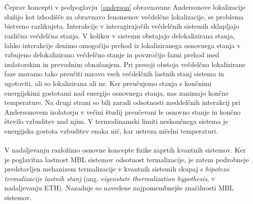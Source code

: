 \\\\ 
Čeprav koncepti v podpoglavju~\ref{anderson} obravnavane Andersonove lokalizacije služijo kot izhodišče za obravnavo fenomenov večdelčne lokalizacije, se problema bistveno razlikujeta. Interakcije v interagirajočih večdelčnih sistemih sklapljajo različna večdelčna stanja. V kolikor v sistemu obstajajo delokalizirana stanja, lahko interakcije denimo omogočijo prehod iz lokaliziranega osnovnega stanja v vzbujeno delokalizirano večdelčno stanje in povzročijo fazni prehod med izolatorskim in prevodnim obnašanjem. Pri presoji obstoja večdelčno lokalizirane faze moramo tako preučiti naravo vseh večdelčnih lastnih stanj sistema in ugotoviti, ali so lokalizirana ali ne. Ker preučujemo stanja s končnimi energijskimi gostotami nad energijo osnovnega stanja, nas zanimajo končne temperature. Na drugi strani so bili zaradi odsotnosti meddelčnih interakcij pri Andersonovem izolatorju v večini študij preučevani le osnovno stanje in končno število vzbuditev nad njim. V termodinamski limiti neskončnega sistema je energijska gostota vzbuditev enaka nič, kar ustreza ničelni temperaturi. 
\\\\
V nadaljevanju razložimo osnovne koncepte fizike zaprtih kvantnih sistemov. Ker je poglavitna lastnost MBL sistemov odsotnost termalizacije, je zatem podrobneje predstavljen mehanizem termalizacije v kvantnih sistemih skupaj s \emph{hipotezo termalizacije lastnih stanj} (ang. \emph{eigenstate thermalization hypothesis}, v nadaljevanju ETH). Nazadnje so navedene najpomembnejše značilnosti MBL sistemov. 
